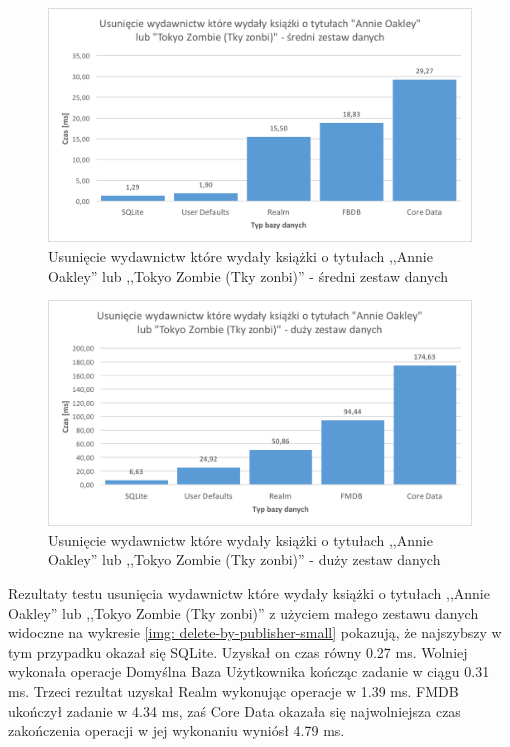 \begin{figure}[H]
    \centering\includegraphics[width=\linewidth]{img/delete_data/delete_by_publisher/delete_by_publisher_medium_test.png}
    \caption{Usunięcie wydawnictw które wydały książki o tytułach ,,Annie Oakley'' lub ,,Tokyo Zombie (Tky zonbi)'' - średni zestaw danych}
    \label{img: delete-by-publisher-medium}
\end{figure}

\begin{figure}[H]
    \centering\includegraphics[width=\linewidth]{img/delete_data/delete_by_publisher/delete_by_publisher_big_test.png}
    \caption{Usunięcie wydawnictw które wydały książki o tytułach ,,Annie Oakley'' lub ,,Tokyo Zombie (Tky zonbi)'' - duży zestaw danych}
    \label{img: delete-by-publisher-big}
\end{figure}

Rezultaty testu usunięcia wydawnictw które wydały książki o tytułach ,,Annie Oakley'' lub ,,Tokyo Zombie (Tky zonbi)'' z użyciem małego zestawu danych widoczne na wykresie \ref{img: delete-by-publisher-small} pokazują, że najszybszy w tym przypadku okazał się SQLite. Uzyskał on czas równy 0.27 ms. Wolniej wykonała operacje Domyślna Baza Użytkownika kończąc zadanie w ciągu 0.31 ms. Trzeci rezultat uzyskał Realm wykonując operacje w 1.39 ms. FMDB ukończył zadanie w 4.34 ms, zaś Core Data okazała się najwolniejsza czas zakończenia operacji w jej wykonaniu wyniósł 4.79 ms. 


